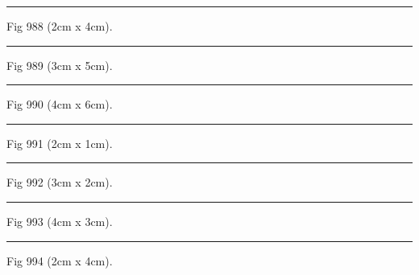 \documentclass[a4paper,11pt]{article}
\begin{document}
\begin{swarmwrap}%
  \begin{minipage}[t]{2cm}
    \centering
    \rule{\linewidth}{4cm}
    {\footnotesize Fig 988 (2cm x 4cm).}
  \end{minipage}%
\end{swarmwrap}%
\swarmwrapnext
\lipsum[88]%

\begin{swarmwrap}%
  \begin{minipage}[t]{3cm}
    \centering
    \rule{\linewidth}{5cm}
    {\footnotesize Fig 989 (3cm x 5cm).}
  \end{minipage}%
\end{swarmwrap}%
\swarmwrapnext
\lipsum[89]%

\begin{swarmwrap}%
  \begin{minipage}[t]{4cm}
    \centering
    \rule{\linewidth}{6cm}
    {\footnotesize Fig 990 (4cm x 6cm).}
  \end{minipage}%
\end{swarmwrap}%
\swarmwrapnext
\lipsum[90]%

\begin{swarmwrap}%
  \begin{minipage}[t]{2cm}
    \centering
    \rule{\linewidth}{1cm}
    {\footnotesize Fig 991 (2cm x 1cm).}
  \end{minipage}%
\end{swarmwrap}%
\swarmwrapnext
\lipsum[91]%

\begin{swarmwrap}%
  \begin{minipage}[t]{3cm}
    \centering
    \rule{\linewidth}{2cm}
    {\footnotesize Fig 992 (3cm x 2cm).}
  \end{minipage}%
\end{swarmwrap}%
\swarmwrapnext
\lipsum[92]%

\begin{swarmwrap}%
  \begin{minipage}[t]{4cm}
    \centering
    \rule{\linewidth}{3cm}
    {\footnotesize Fig 993 (4cm x 3cm).}
  \end{minipage}%
\end{swarmwrap}%
\swarmwrapnext
\lipsum[93]%

\begin{swarmwrap}%
  \begin{minipage}[t]{2cm}
    \centering
    \rule{\linewidth}{4cm}
    {\footnotesize Fig 994 (2cm x 4cm).}
  \end{minipage}%
\end{swarmwrap}%
\swarmwrapnext
\lipsum[94]%
\end{document}
